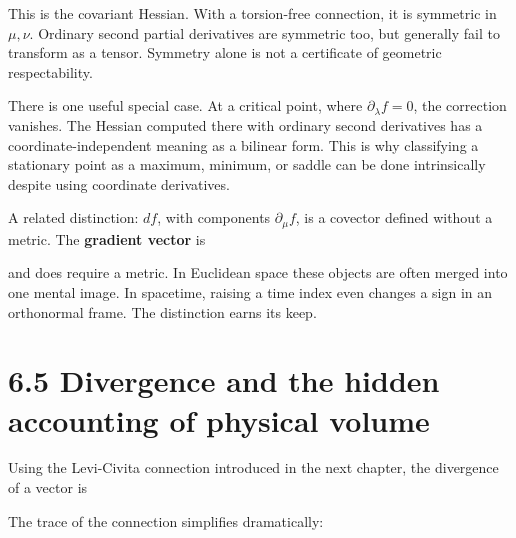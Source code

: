 \documentclass[
  11pt,
  letterpaper,
  oneside,
  openany]{scrbook}
\begin{document}
This is the covariant Hessian. With a torsion-free connection, it is
symmetric in \(\mu,\nu\). Ordinary second partial derivatives are
symmetric too, but generally fail to transform as a tensor. Symmetry
alone is not a certificate of geometric respectability.

There is one useful special case. At a critical point, where
\(\partial_\lambda f=0\), the correction vanishes. The Hessian computed
there with ordinary second derivatives has a coordinate-independent
meaning as a bilinear form. This is why classifying a stationary point
as a maximum, minimum, or saddle can be done intrinsically despite using
coordinate derivatives.

A related distinction: \(df\), with components \(\partial_\mu f\), is a
covector defined without a metric. The \textbf{gradient vector} is

\begin{center}
\begingroup
{}
\ifdim\wd\grmathbox>\linewidth
\resizebox{\linewidth}{!}{\usebox{\grmathbox}}
\else\usebox{\grmathbox}\fi
\endgroup
\end{center}

and does require a metric. In Euclidean space these objects are often
merged into one mental image. In spacetime, raising a time index even
changes a sign in an orthonormal frame. The distinction earns its keep.

\hypertarget{divergence-and-the-hidden-accounting-of-physical-volume}{%
\section{6.5 Divergence and the hidden accounting of physical
volume}\label{divergence-and-the-hidden-accounting-of-physical-volume}}

Using the Levi-Civita connection introduced in the next chapter, the
divergence of a vector is

\begin{center}
\begingroup
{}
\ifdim\wd\grmathbox>\linewidth
\resizebox{\linewidth}{!}{\usebox{\grmathbox}}
\else\usebox{\grmathbox}\fi
\endgroup
\end{center}

The trace of the connection simplifies dramatically:
\end{document}
